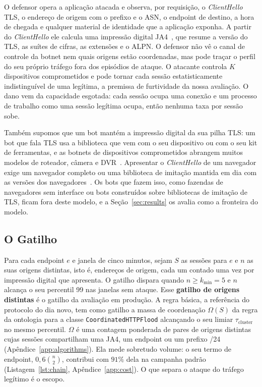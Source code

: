 \documentclass[conference,letterpaper,10pt]{IEEEtran}
\newcommand\1{\textit{(i)}}
\newcommand\2{\textit{(ii)}}
\newcommand\3{\textit{(iii)}}
\begin{document}
O defensor opera a aplicação atacada e observa, por requisição, o \textit{ClientHello} TLS, o endereço de origem com o prefixo e o ASN, o endpoint de destino, a hora de chegada e qualquer material de identidade que a aplicação exponha. A partir do \textit{ClientHello} ele calcula uma impressão digital JA4~\cite{althouse2023ja4}, que resume a versão do TLS, as suítes de cifras, as extensões e o ALPN. O defensor não vê o canal de controle da botnet nem quais origens estão coordenadas, mas pode traçar o perfil do seu próprio tráfego fora dos episódios de ataque. O atacante controla $K$ dispositivos comprometidos e pode tornar cada sessão estatisticamente indistinguível de uma legítima, a premissa de furtividade da nossa avaliação. O dano vem da capacidade esgotada: cada sessão ocupa uma conexão e um processo de trabalho como uma sessão legítima ocupa, então nenhuma taxa por sessão sobe.

Também supomos que um bot mantém a impressão digital da sua pilha TLS: um bot que fala TLS usa a biblioteca que vem com o seu dispositivo ou com o seu kit de ferramentas, e as botnets de dispositivos comprometidos abrangem muitos modelos de roteador, câmera e DVR~\cite{antonakakis2017mirai}. Apresentar o \textit{ClientHello} de um navegador exige um navegador completo ou uma biblioteca de imitação mantida em dia com as versões dos navegadores~\cite{frolov2019tls}. Os bots que fazem isso, como fazendas de navegadores sem interface ou bots construídos sobre bibliotecas de imitação de TLS, ficam fora deste modelo, e a Seção~\ref{sec:results} os avalia como a fronteira do modelo.

\subsection{O Gatilho}
\label{sec:rule}

Para cada endpoint $e$ e janela de cinco minutos, sejam $S$ as sessões para $e$ e $n$ as suas origens distintas, isto é, endereços de origem, cada um contado uma vez por impressão digital que apresenta. O gatilho dispara quando $n \geq k_{\min} = 5$ e $n$ alcança o seu percentil 99 nas janelas sem ataque. Esse \textbf{gatilho de origens distintas} é o gatilho da avaliação em produção. A regra básica, a referência do protocolo do dia novo, tem como gatilho a massa de coordenação $\Omega(S)$ da regra da ontologia para a classe \texttt{CoordinatedHTTPFlood} alcançando o seu limiar $\tau_{\mathrm{cluster}}$ no mesmo percentil. $\Omega$ é uma contagem ponderada de pares de origens distintas cujas sessões compartilham uma JA4, um endpoint ou um prefixo /24 (Apêndice~\ref{app:algorithms}). Ela mede sobretudo volume: o seu termo de endpoint, $0{,}6\binom{n}{2}$, contribui com $91\%$ dela na campanha padrão (Listagem~\ref{lst:chain}, Apêndice~\ref{app:cost}). O que separa o ataque do tráfego legítimo é o escopo.
\end{document}
